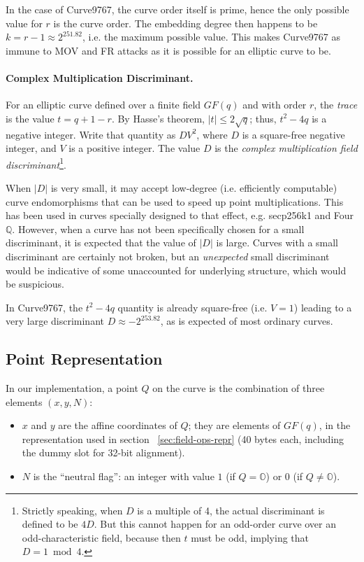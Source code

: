 \documentclass{llncs}
\newcommand{\GF}{GF}
\newcommand{\neutral}{\mathbb{O}}
\begin{document}
In the case of Curve9767, the curve order itself is prime, hence the
only possible value for $r$ is the curve order. The embedding degree
then happens to be $k = r-1 \approx 2^{251.82}$, i.e. the maximum
possible value. This makes Curve9767 as immune to MOV and FR attacks as
it is possible for an elliptic curve to be.

\paragraph{Complex Multiplication Discriminant.}

For an elliptic curve defined over a finite field $\GF(q)$ and with
order $r$, the \emph{trace} is the value $t = q + 1 - r$. By Hasse's
theorem, $|t| \leq 2\sqrt{q}$; thus, $t^2-4q$ is a negative integer.
Write that quantity as $DV^2$, where $D$ is a square-free negative
integer, and $V$ is a positive integer. The value $D$ is the
\emph{complex multiplication field discriminant}\footnote{Strictly
speaking, when $D$ is a multiple of 4, the actual discriminant is
defined to be $4D$. But this cannot happen for an odd-order curve over
an odd-characteristic field, because then $t$ must be odd, implying that
$D = 1\bmod 4$.}.

When $|D|$ is very small, it may accept low-degree (i.e. efficiently
computable) curve endomorphisms that can be used to speed up point
multiplications\cite{GalLamVan2001,LonSic2014}. This has been used in
curves specially designed to that effect, e.g. secp256k1\cite{SEC2} and
Four$\mathbb{Q}$\cite{CraLon2015}. However, when a curve has not been
specifically chosen for a small discriminant, it is expected that the
value of $|D|$ is large. Curves with a small discriminant are certainly
not broken, but an \emph{unexpected} small discriminant would be
indicative of some unaccounted for underlying structure, which would be
suspicious.

In Curve9767, the $t^2-4q$ quantity is already square-free (i.e. $V = 1$)
leading to a very large discriminant $D \approx -2^{253.82}$, as is
expected of most ordinary curves.

\subsection{Point Representation}

In our implementation, a point $Q$ on the curve is the combination of
three elements $(x,y,N)$:
\begin{itemize}

    \item $x$ and $y$ are the affine coordinates of $Q$; they are
    elements of $\GF(q)$, in the representation used in section
    ~\ref{sec:field-ops-repr} (40 bytes each, including the dummy slot
    for 32-bit alignment).

    \item $N$ is the ``neutral flag'': an integer with value $1$ (if
    $Q = \neutral$) or $0$ (if $Q \neq \neutral$).

\end{itemize}
\end{document}
